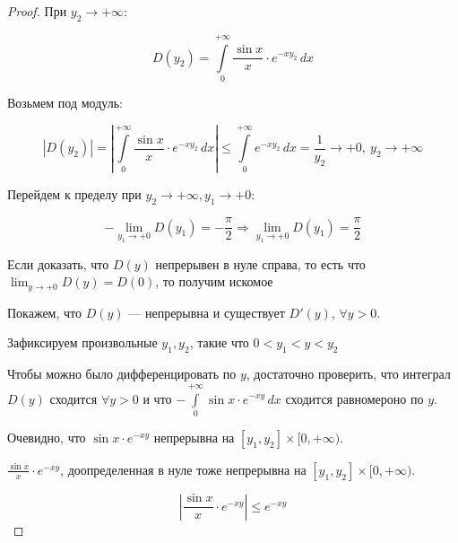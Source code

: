 \begin{proof}
\noindent При $y_2 \to +\infty$:

\[
D(y_2) = \int\limits_0^{+\infty} \frac{\sin x}{x} \cdot e^{-x y_2} \, dx
\]

Возьмем под модуль:

\[
\left| D(y_2) \right| 
= \left| \int\limits_0^{+\infty} \frac{\sin x}{x} \cdot e^{-x y_2} \, dx \right|
\leq \int\limits_0^{+\infty} e^{-x y_2} \, dx
= \frac{1}{y_2} \longrightarrow +0, \  y_2 \to +\infty
\]



\noindent Перейдем к пределу при $y_2 \rightarrow + \infty,  y_1 \rightarrow +0$: 

\[
- \lim_{y_1 \to +0} D(y_1) = -\frac{\pi}{2} \Rightarrow \lim_{y_1 \to +0} D(y_1) = \frac{\pi}{2}
\]

\begin{note}
Если доказать, что $D(y)$ непрерывен в нуле справа, то есть что $\lim_{y \to +0} D(y) = D(0)$, то получим искомое
\end{note}

\noindent Покажем, что \( D(y) \) — непрерывна и существует \( D'(y) \), \( \forall y > 0 \).

\noindent Зафиксируем произвольные \( y_1, y_2 \), такие что \( 0 < y_1 < y < y_2 \)

\begin{center}
\end{center}


\begin{note}
Чтобы можно было дифференцировать по $y$, достаточно проверить, что интеграл $D(y)$ сходится $\forall y > 0$ и что $- \int\limits_0^{+\infty} \sin x \cdot e^{-x y} \, dx$ сходится равномероно по $y$.
\end{note}

\noindent Очевидно, что $ \sin x \cdot e^{-x y}$ непрерывна на $[y_1, y_2] \times [0, +\infty)$.

\noindent $\frac{\sin{x}}{x}\cdot e^{-x y}$, доопределенная в нуле тоже непрерывна на $[y_1, y_2] \times [0, +\infty)$.


\[
\left| \frac{\sin x}{x} \cdot e^{-x y} \right| \leq e^{-x y}
\]


\end{proof}
